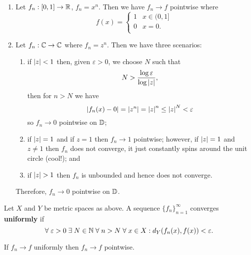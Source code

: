 \begin{example}
    \begin{enumerate}
        \item Let $f_n: [0, 1] \to \mathbb{R}$, $f_n = x^n$. 
            Then we have $f_n \to f$ pointwise where
            \[ 
                f(x) =
                \begin{cases}
                    1 & x \in (0, 1] \\
                    0 & x = 0. \\
                \end{cases}
            \]

        \item Let $f_n : \mathbb{C} \to \mathbb{C}$ where $f_n = z^n$. Then we have three scenarios:
            \begin{enumerate}
                \item if $\left\lvert z\right\rvert < 1$ then, given $\varepsilon > 0$, we choose $N$ such that 
                    \[ N > \frac{\log{\varepsilon}}{\log\left\lvert z\right\rvert}, \]
                    then for $n  > N$ we have
                    \[ \left\lvert f_n(x) - 0\right\rvert = \left\lvert z^n\right\rvert = \left\lvert z\right\rvert^n \leq \left\lvert z\right\rvert^N < \varepsilon \]
                    so $f_n \to 0$ pointwise on $\mathbb{D}$;

                \item if $\left\lvert z\right\rvert = 1$ and if $z = 1$ then $f_n \to 1$ pointwise; however, if $\left\lvert z\right\rvert = 1$ and $z \neq 1$ then $f_n$ does not converge, it just constantly spins around the unit circle (cool!); and

                \item if $\left\lvert z\right\rvert > 1$ then $f_n$ is unbounded and hence does not converge.
            \end{enumerate}
            Therefore, $f_n \to 0$ pointwise on $\mathbb{D}$.
    \end{enumerate}
\end{example}

\begin{definition}
    Let $X$ and $Y$ be metric spaces as above. 
    A sequence $\{f_n\}_{n = 1}^\infty$ converges \textbf{uniformly} if
    \[ \;\forall\; \varepsilon > 0 \;\exists\; N \in \mathbb{N} \;\forall\; n > N \;\forall\; x \in X: d_Y(f_n(x), f(x)) < \varepsilon. \]
\end{definition}

\begin{lemma}[]
    If $f_n \to f$ uniformly then $f_n \to f$ pointwise.
\end{lemma}

